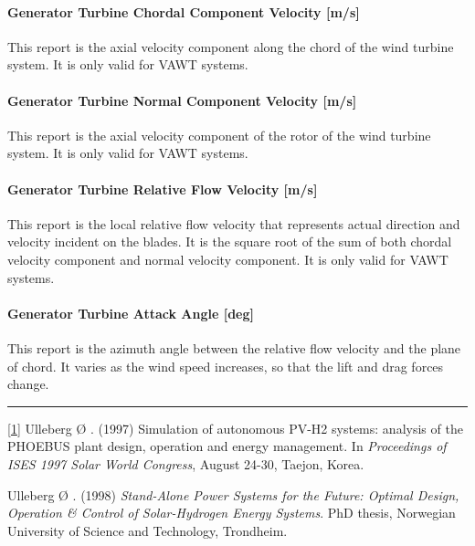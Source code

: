 \paragraph{Generator Turbine Chordal Component Velocity {[}m/s{]}}\label{generator-turbine-chordal-component-velocity-ms}

This report is the axial velocity component along the chord of the wind turbine system. It is only valid for VAWT systems.

\paragraph{Generator Turbine Normal Component Velocity {[}m/s{]}}\label{generator-turbine-normal-component-velocity-ms}

This report is the axial velocity component of the rotor of the wind turbine system. It is only valid for VAWT systems.

\paragraph{Generator Turbine Relative Flow Velocity {[}m/s{]}}\label{generator-turbine-relative-flow-velocity-ms}

This report is the local relative flow velocity that represents actual direction and velocity incident on the blades. It is the square root of the sum of both chordal velocity component and normal velocity component. It is only valid for VAWT systems.

\paragraph{Generator Turbine Attack Angle {[}deg{]}}\label{generator-turbine-attack-angle-deg}

This report is the azimuth angle between the relative flow velocity and the plane of chord. It varies as the wind speed increases, so that the lift and drag forces change.

\begin{center}\rule{0.5\linewidth}{0.4pt}\end{center}

\protect\hyperlink{ux5fftnref1}{{[}1{]}} Ulleberg Ø . (1997) Simulation of autonomous PV-H2 systems: analysis of the PHOEBUS plant design, operation and energy management. In \emph{Proceedings of ISES 1997 Solar World Congress}, August 24-30, Taejon, Korea.

Ulleberg Ø . (1998) \emph{Stand-Alone Power Systems for the Future: Optimal Design, Operation \& Control of Solar-Hydrogen Energy Systems}. PhD thesis, Norwegian University of Science and Technology, Trondheim.
